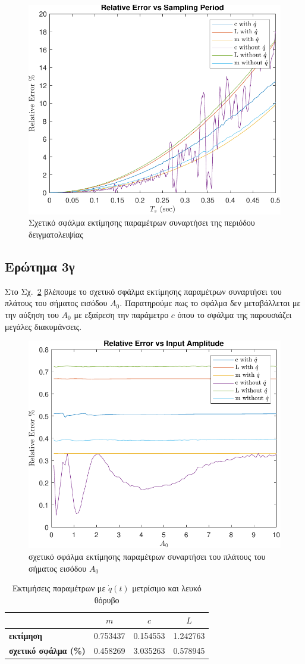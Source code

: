\documentclass[a4paper,12pt]{article}
\begin{document}
\begin{figure}
    \centering
    \includegraphics[width=0.5\linewidth]{plot/task3_parameter_estimation_error_vs_sampling_period.pdf}
    \caption{Σχετικό σφάλμα εκτίμησης παραμέτρων συναρτήσει της περιόδου δειγματολειψίας}
    \label{fig:task3_parameter_estimation_error_vs_sampling_period}
\end{figure}

\subsection*{Ερώτημα 3γ}

Στο Σχ.~\ref{fig:task3_parameter_estimation_error_vs_input_amplitude} βλέπουμε το σχετικό σφάλμα εκτίμησης παραμέτρων
συναρτήσει του πλάτους του σήματος εισόδου $A_0$. Παρατηρούμε πως το σφάλμα δεν μεταβάλλεται με την αύξηση του $A_0$
με εξαίρεση την παράμετρο $c$ όπου το σφάλμα της παρουσιάζει μεγάλες διακυμάνσεις.

\begin{figure}
    \centering
    \includegraphics[width=0.5\linewidth]{plot/task3_parameter_estimation_error_vs_input_amplitude.pdf}
    \caption{σχετικό σφάλμα εκτίμησης παραμέτρων συναρτήσει του πλάτους του σήματος εισόδου $A_0$}
    \label{fig:task3_parameter_estimation_error_vs_input_amplitude}
\end{figure}

\begin{table}[h!]
\centering
\begin{tabular}{|l|c|c|c|}
\hline
\multicolumn{1}{|c|}{} & \multicolumn{1}{c|}{$m$} & \multicolumn{1}{c|}{$c$} & \multicolumn{1}{c|}{$L$} \\
\hline
\textbf{εκτίμηση} & 0.753437 & 0.154553 & 1.242763 \\
\textbf{σχετικό σφάλμα (\%)} & 0.458269 & 3.035263 & 0.578945 \\
\hline
\end{tabular}
\caption{Εκτιμήσεις παραμέτρων με $\dot{q}(t)$ μετρίσιμο και λευκό θόρυβο}
\label{tab:task3_estimations_with_derivative_WGN}
\end{table}
\end{document}
